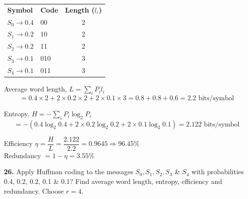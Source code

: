 \documentclass[12pt]{article}
\begin{document}
\begin{center}
\end{center}

\begin{table}[ht]
	\centering
	\renewcommand{\arraystretch}{1.2}
	\begin{tabular}{l l c}
		\rowcolor{black!10}
		\textbf{Symbol}       & \textbf{Code} & \textbf{Length ($l_i$)} \\
		$S_0 \rightarrow 0.4$ & 00            & 2                       \\
		$S_1 \rightarrow 0.2$ & 10            & 2                       \\
		$S_2 \rightarrow 0.2$ & 11            & 2                       \\
		$S_3 \rightarrow 0.1$ & 010           & 3                       \\
		$S_4 \rightarrow 0.1$ & 011           & 3                       \\
	\end{tabular}
\end{table}

Average word length, $L = \sum_i P_i l_i$
$$= 0.4 \times 2 + 2 \times 0.2 \times 2 + 2 \times 0.1 \times 3 = 0.8 + 0.8 + 0.6 = 2.2 \text{ bits/symbol}$$

Entropy, $H = -\sum_i P_i \log_2 P_i$
$$= -(0.4 \log_2 0.4 + 2 \times 0.2 \log_2 0.2 + 2 \times 0.1 \log_2 0.1) = 2.122 \text{ bits/symbol}$$

Efficiency $\eta = \dfrac{H}{L} = \dfrac{2.122}{2.2} = 0.9645 \Rightarrow 96.45\%$ \\

Redundancy $= 1 - \eta = 3.55\%$


\vspace{0.5cm}
\noindent \textbf{26.} Apply Huffman coding to the messages $S_0, S_1, S_2, S_3$ \& $S_4$ with probabilities 0.4, 0.2, 0.2, 0.1 \& 0.1? Find average word length, entropy, efficiency and redundancy. Choose $r=4$.
\end{document}
